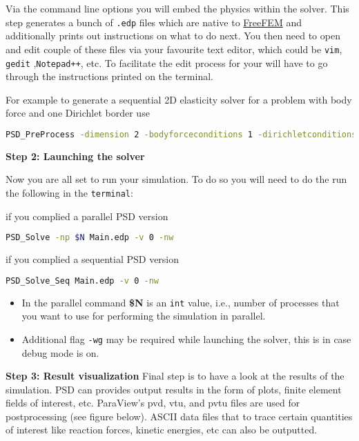 Via the command line options you will embed the physics within the
solver. This step generates a bunch of \lstinline!.edp! files which are
native to \href{https://freefem.org/}{FreeFEM} and additionally prints
out instructions on what to do next. You then need to open and edit
couple of these files via your favourite text editor, which could be
\lstinline!vim!, \lstinline!gedit! ,\lstinline!Notepad++!, etc. To
facilitate the edit process for your will have to go through the
instructions printed on the terminal.

For example to generate a sequential 2D elasticity solver for a problem
with body force and one Dirichlet border use

\begin{lstlisting}[language=bash]
PSD_PreProcess -dimension 2 -bodyforceconditions 1 -dirichletconditions 1
\end{lstlisting}

\textbf{Step 2: Launching the solver}

Now you are all set to run your simulation. To do so you will need to do
the run the following in the \lstinline!terminal!:

if you complied a parallel PSD version

\begin{lstlisting}[language=bash]
PSD_Solve -np $N Main.edp -v 0 -nw
\end{lstlisting}

if you complied a sequential PSD version

\begin{lstlisting}[language=bash]
PSD_Solve_Seq Main.edp -v 0 -nw
\end{lstlisting}

\begin{itemize}
\item
  In the parallel command \textbf{\$N} is an \lstinline!int! value,
  i.e., number of processes that you want to use for performing the
  simulation in parallel.
\item
  Additional flag \lstinline!-wg! may be required while launching the
  solver, this is in case debug mode is on.
\end{itemize}

\textbf{Step 3: Result visualization} Final step is to have a look at
the results of the simulation. PSD can provides output results in the
form of plots, finite element fields of interest, etc. ParaView's pvd,
vtu, and pvtu files are used for postprocessing (see figure below).
ASCII data files that to trace certain quantities of interest like
reaction forces, kinetic energies, etc can also be outputted.

